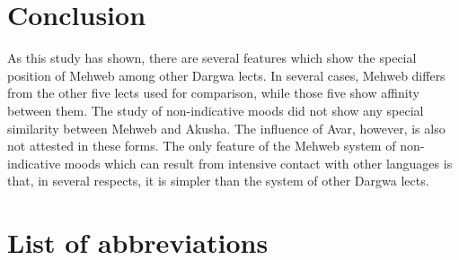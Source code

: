 ﻿\documentclass[output=paper]{langsci/langscibook}
\begin{document}
\section{Conclusion}

As this study has shown, there are several features which show the
special position of Mehweb among other Dargwa lects. In several cases,
Mehweb differs from the other five lects used for comparison, while those
five show affinity between them. The study of non-indicative moods did
not show any special similarity between Mehweb and Akusha. The influence
of Avar, however, is also not attested in these forms. The only feature
of the Mehweb system of non-indicative moods which can result from intensive
contact with other languages is that, in several respects, it is simpler
than the system of other Dargwa lects.

\section*{List of abbreviations}
\end{document}
